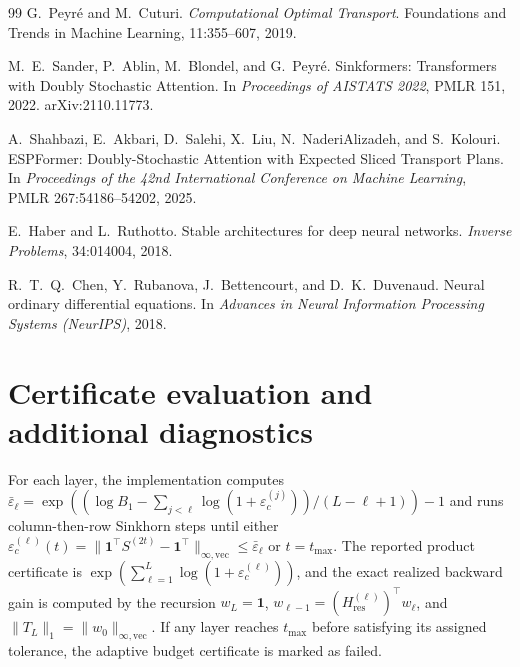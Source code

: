 \documentclass[10pt]{article}
\numberwithin{equation}{section}
\theoremstyle{plain}
\theoremstyle{definition}
\theoremstyle{remark}
\newcommand{\ones}{\mathbf{1}}
\newcommand{\Hres}{H_{\mathrm{res}}}
\begin{document}
\begin{thebibliography}{99}
G.~Peyr\'e and M.~Cuturi.
\newblock \emph{Computational Optimal Transport}.
\newblock Foundations and Trends in Machine Learning, 11:355--607, 2019.

M.~E.~Sander, P.~Ablin, M.~Blondel, and G.~Peyr\'e.
\newblock Sinkformers: Transformers with Doubly Stochastic Attention.
\newblock In \emph{Proceedings of AISTATS 2022}, PMLR 151, 2022.
\newblock arXiv:2110.11773.

A.~Shahbazi, E.~Akbari, D.~Salehi, X.~Liu, N.~NaderiAlizadeh, and S.~Kolouri.
\newblock ESPFormer: Doubly-Stochastic Attention with Expected Sliced Transport Plans.
\newblock In \emph{Proceedings of the 42nd International Conference on Machine Learning},
PMLR 267:54186--54202, 2025.


E.~Haber and L.~Ruthotto.
\newblock Stable architectures for deep neural networks.
\newblock \emph{Inverse Problems}, 34:014004, 2018.

R.~T.~Q.~Chen, Y.~Rubanova, J.~Bettencourt, and D.~K.~Duvenaud.
\newblock Neural ordinary differential equations.
\newblock In \emph{Advances in Neural Information Processing Systems (NeurIPS)}, 2018.


\end{thebibliography}

\appendix

\renewcommand{\thetable}{A.\arabic{table}}
\setcounter{table}{0}
\renewcommand{\theHtable}{appendix.A.\arabic{table}}
\renewcommand{\thefigure}{A.\arabic{figure}}
\setcounter{figure}{0}
\renewcommand{\theHfigure}{appendix.A.\arabic{figure}}


\section{Certificate evaluation and additional diagnostics}
\label{app:certificate-evaluation}

For each layer, the implementation computes
\(\bar\varepsilon_\ell
=\exp((\log B_1-\sum_{j<\ell}\log(1+\varepsilon_c^{(j)}))/(L-\ell+1))-1\)
and runs column-then-row Sinkhorn steps until either
\(\varepsilon_c^{(\ell)}(t)=
\|\ones^\top S^{(2t)}-\ones^\top\|_{\infty,\mathrm{vec}}
\le \bar\varepsilon_\ell\) or \(t=t_{\max}\). The reported product
certificate is \(\exp(\sum_{\ell=1}^L\log(1+\varepsilon_c^{(\ell)}))\), and
the exact realized backward gain is computed by the recursion \(w_L=\ones\),
\(w_{\ell-1}=(\Hres^{(\ell)})^\top w_\ell\), and
\(\|T_L\|_1=\|w_0\|_{\infty,\mathrm{vec}}\).
If any layer reaches \(t_{\max}\) before satisfying its assigned tolerance, the adaptive
budget certificate is marked as failed.
\end{document}
